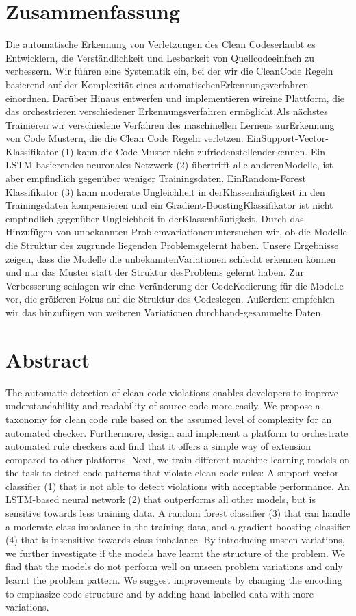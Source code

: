\section*{Zusammenfassung}

Die automatische Erkennung von Verletzungen des Clean Codeserlaubt es Entwicklern, die Verständlichkeit und Lesbarkeit von Quellcodeeinfach zu verbessern. Wir führen eine Systematik ein, bei der wir die CleanCode Regeln basierend auf der Komplexität eines automatischenErkennungsverfahren einordnen. Darüber Hinaus entwerfen und implementieren wireine Plattform, die das orchestrieren verschiedener Erkennungsverfahren ermöglicht.Als nächstes Trainieren wir verschiedene Verfahren des maschinellen Lernens zurErkennung von Code Mustern, die die Clean Code Regeln verletzen: EinSupport-Vector-Klassifikator (1) kann die Code Muster nicht zufriedenstellenderkennen. Ein LSTM basierendes neuronales Netzwerk (2) übertrifft alle anderenModelle, ist aber empfindlich gegenüber weniger Trainingsdaten. EinRandom-Forest Klassifikator (3) kann moderate Ungleichheit in derKlassenhäufigkeit in den Trainingsdaten kompensieren und ein Gradient-BoostingKlassifikator ist nicht empfindlich gegenüber Ungleichheit in derKlassenhäufigkeit. Durch das Hinzufügen von unbekannten Problemvariationenuntersuchen wir, ob die Modelle die Struktur des zugrunde liegenden Problemsgelernt haben. Unsere Ergebnisse zeigen, dass die Modelle die unbekanntenVariationen schlecht erkennen können und nur das Muster statt der Struktur desProblems gelernt haben. Zur Verbesserung schlagen wir eine Veränderung der CodeKodierung für die Modelle vor, die größeren Fokus auf die Struktur des Codeslegen. Außerdem empfehlen wir das hinzufügen von weiteren Variationen durchhand-gesammelte Daten.

\newpage
\section*{Abstract}    
The automatic detection of clean code violations enables developers to improve understandability and readability of source code more easily. We propose a taxonomy for clean code rule based on the assumed level of complexity for an automated checker. Furthermore, design and implement a platform to orchestrate automated rule checkers and find that it offers a simple way of extension compared to other platforms. Next, we train different machine learning models on the task to detect code patterns that violate clean code rules: A support vector classifier (1) that is not able to detect violations with acceptable performance. An LSTM-based neural network (2) that outperforms all other models, but is sensitive towards less training data. A random forest classifier (3) that can handle a moderate class imbalance in the training data, and a gradient boosting classifier (4) that is insensitive towards class imbalance. By introducing unseen variations, we further investigate if the models have learnt the structure of the problem. We find that the models do not perform well on unseen problem variations and only learnt the problem pattern. We suggest improvements by changing the encoding to emphasize code structure and by adding hand-labelled data with more variations.